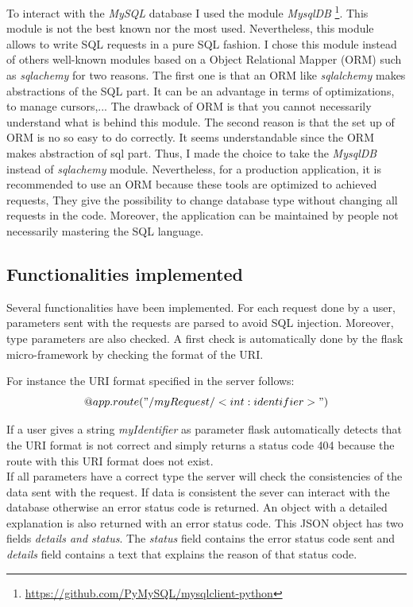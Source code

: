 To interact with the \textit{MySQL} database I used the module \textit{MysqlDB} \footnote{\url{https://github.com/PyMySQL/mysqlclient-python}}. This module is not the best known nor the most used. Nevertheless, this module allows to write SQL requests in a pure SQL fashion. I chose this module instead of others well-known modules based on a Object Relational Mapper (ORM) such as \textit{sqlachemy} for two reasons. The first one is that an ORM like \textit{sqlalchemy} makes abstractions of the SQL part. It can be an advantage in terms of optimizations, to manage cursors,... The drawback of ORM is that you cannot necessarily understand what is behind this module. The second reason is that the set up of ORM is no so easy to do correctly. It seems understandable since the ORM makes abstraction of sql part. Thus, I made the choice to take the \textit{MysqlDB} instead of \textit{sqlachemy} module. Nevertheless, for a production application, it is recommended to use an ORM because these tools are optimized to achieved requests, They give the possibility to change database type without changing all requests in the code. Moreover, the application can be maintained by people not necessarily mastering the SQL language.
\subsection{Functionalities implemented}
Several functionalities have been implemented. For each request done by a user, parameters sent with the requests are parsed to avoid SQL injection. Moreover, type parameters are also checked. A first check is automatically  done by the flask micro-framework by checking the format of the URI.

For instance the URI format specified in the server follows:
$$ @app.route("/myRequest/<int:identifier>")$$

If a user gives a string \textit{myIdentifier} as parameter flask automatically detects that the URI format is not correct and simply returns a status code 404 because the route with this URI format does not exist.\\

If all parameters have a correct type the server will check the consistencies of the data sent with the request. If data is consistent the sever can interact with the database otherwise an error status code is returned. An object with a detailed explanation is also returned with an error status code. This JSON object has two fields \textit{details and status}. The \textit{status} field contains the error status code sent and \textit{details} field contains a text that explains the reason of that status code.
 
